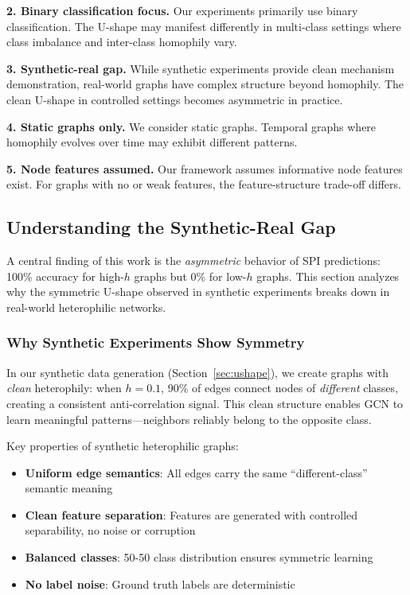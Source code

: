 \textbf{2. Binary classification focus.} Our experiments primarily use binary classification. The U-shape may manifest differently in multi-class settings where class imbalance and inter-class homophily vary.

\textbf{3. Synthetic-real gap.} While synthetic experiments provide clean mechanism demonstration, real-world graphs have complex structure beyond homophily. The clean U-shape in controlled settings becomes asymmetric in practice.

\textbf{4. Static graphs only.} We consider static graphs. Temporal graphs where homophily evolves over time may exhibit different patterns.

\textbf{5. Node features assumed.} Our framework assumes informative node features exist. For graphs with no or weak features, the feature-structure trade-off differs.

\subsection{Understanding the Synthetic-Real Gap}
\label{sec:synthetic_real_gap}

A central finding of this work is the \textit{asymmetric} behavior of SPI predictions: 100\% accuracy for high-$h$ graphs but 0\% for low-$h$ graphs. This section analyzes why the symmetric U-shape observed in synthetic experiments breaks down in real-world heterophilic networks.

\subsubsection{Why Synthetic Experiments Show Symmetry}

In our synthetic data generation (Section~\ref{sec:ushape}), we create graphs with \textit{clean} heterophily: when $h = 0.1$, 90\% of edges connect nodes of \textit{different} classes, creating a consistent anti-correlation signal. This clean structure enables GCN to learn meaningful patterns---neighbors reliably belong to the opposite class.

Key properties of synthetic heterophilic graphs:
\begin{itemize}
    \item \textbf{Uniform edge semantics}: All edges carry the same ``different-class'' semantic meaning
    \item \textbf{Clean feature separation}: Features are generated with controlled separability, no noise or corruption
    \item \textbf{Balanced classes}: 50-50 class distribution ensures symmetric learning
    \item \textbf{No label noise}: Ground truth labels are deterministic
\end{itemize}

